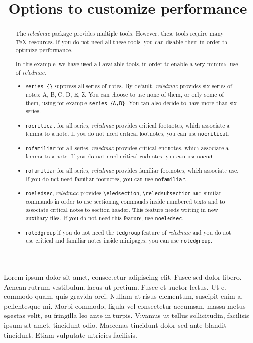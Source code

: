 \documentclass{article}
\begin{document}
\begin{english}
\title{Options to customize performance}
\maketitle
\begin{abstract}
The \emph{reledmac} package provides multiple tools. However, these tools require many \TeX\ resources. If you do not need all these tools, you can disable them in order to optimize performance.

In this example, we have used all available tools, in order to enable a very minimal use of \emph{reledmac}.

\begin{itemize}
  \item\verb+series={}+ suppress all series of notes. By default, \emph{reledmac} provides six series of notes: A, B, C, D, E, Z. You can choose to use none of them, or only some of them, using for example \verb+series={A,B}+. You can also decide to have more than six series.
  \item\verb+nocritical+ for all series, \emph{reledmac} provides critical footnotes, which associate a lemma to a note. If you do not need critical footnotes, you can use \verb+nocritical+.
  \item\verb+nofamiliar+ for all series, \emph{reledmac} provides critical endnotes, which associate a lemma to a note. If you do not need critical endnotes, you can use \verb+noend+.
  \item\verb+nofamiliar+ for all series, \emph{reledmac} provides familiar footnotes, which associate use. If you do not need familiar footnotes, you can use \verb+nofamiliar+.
  \item\verb+noeledsec+, \emph{reledmac} provides \verb+\eledsection+, \verb+\reledsubsection+ and similar commands in order to use sectioning commands inside numbered texts and to associate critical notes to section header. This feature needs writing in new auxiliary files. If you do not need this feature, use \verb+noeledsec+.
  \item\verb+noledgroup+ if you do not need the \verb+ledgroup+ feature of \emph{reledmac} and you do not use critical and familiar notes inside minipages, you can use \verb+noledgroup+.
\end{itemize}


\end{abstract}
\end{english}

\beginnumbering
\pstart
Lorem ipsum dolor sit amet, consectetur adipiscing elit. Fusce sed dolor libero. Aenean rutrum vestibulum lacus ut pretium. Fusce et auctor lectus. Ut et commodo quam, quis gravida orci. Nullam at risus elementum, suscipit enim a, pellentesque mi. Morbi commodo, ligula vel consectetur accumsan, massa metus egestas velit, eu fringilla leo ante in turpis. Vivamus ut tellus sollicitudin, facilisis ipsum sit amet, tincidunt odio. Maecenas tincidunt dolor sed ante blandit tincidunt. Etiam vulputate ultricies facilisis.
\pend
\endnumbering
\end{document}
